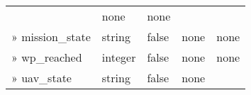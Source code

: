 \documentclass[
]{article}
\begin{document}
\begin{longtable}[]{@{}lllll@{}}
\begin{minipage}[t]{0.17\columnwidth}
\end{minipage} & \begin{minipage}[t]{0.17\columnwidth}\raggedright
none\strut
\end{minipage} & \begin{minipage}[t]{0.17\columnwidth}\raggedright
none\strut
\end{minipage}\tabularnewline
\begin{minipage}[t]{0.17\columnwidth}\raggedright
» mission\_state\strut
\end{minipage} & \begin{minipage}[t]{0.17\columnwidth}\raggedright
string\strut
\end{minipage} & \begin{minipage}[t]{0.17\columnwidth}\raggedright
false\strut
\end{minipage} & \begin{minipage}[t]{0.17\columnwidth}\raggedright
none\strut
\end{minipage} & \begin{minipage}[t]{0.17\columnwidth}\raggedright
none\strut
\end{minipage}\tabularnewline
\begin{minipage}[t]{0.17\columnwidth}\raggedright
» wp\_reached\strut
\end{minipage} & \begin{minipage}[t]{0.17\columnwidth}\raggedright
integer\strut
\end{minipage} & \begin{minipage}[t]{0.17\columnwidth}\raggedright
false\strut
\end{minipage} & \begin{minipage}[t]{0.17\columnwidth}\raggedright
none\strut
\end{minipage} & \begin{minipage}[t]{0.17\columnwidth}\raggedright
none\strut
\end{minipage}\tabularnewline
\begin{minipage}[t]{0.17\columnwidth}\raggedright
» uav\_state\strut
\end{minipage} & \begin{minipage}[t]{0.17\columnwidth}\raggedright
string\strut
\end{minipage} & \begin{minipage}[t]{0.17\columnwidth}\raggedright
false\strut
\end{minipage} & \begin{minipage}[t]{0.17\columnwidth}\raggedright
none\strut

\end{minipage}
\end{longtable}
\end{document}
